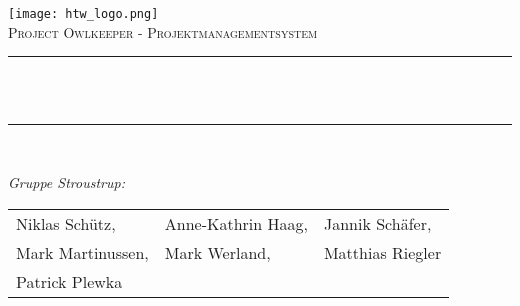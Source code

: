 
\begin{titlepage}
	\flushleft
    \vspace*{0.5 cm}
    \texttt{[image: htw\_logo.png]}\\[1.0 cm]							%
   	
	\textsc{\Large Project Owlkeeper - Projektmanagementsystem}\\[0.5 cm]			%
	\centering
	\rule{\linewidth}{0.2 mm} \\[0.4 cm]
	{ \huge \bfseries \thetitle}\\
	\rule{\linewidth}{0.2 mm} \\[1.5 cm]

	\begin{flushleft} \large
		\emph{Gruppe Stroustrup:}\\
		\begin{tabular}{ p{} p{} p{} }
			Niklas Schütz, & Anne-Kathrin Haag, & Jannik Schäfer, \\
			Mark Martinussen, & Mark Werland,  & Matthias Riegler \\
			Patrick Plewka & & \\ 
		\end{tabular}
	\end{flushleft}

\end{titlepage}